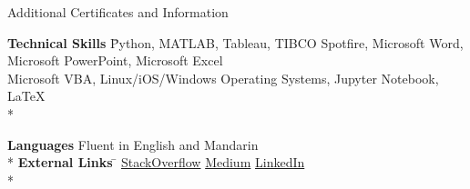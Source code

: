 \documentclass{article}
\newlength{\tabin}
\newlength{\secsep}
\newcommand{\lineunder}{\vspace*{-8pt} \\ \hspace*{-6pt} \hrulefill \\ \vspace*{-15pt}}
\newenvironment{tabbedsection}[1]{
  \begin{list}{}{
      \setlength{\itemsep}{0pt}
      \setlength{\labelsep}{0pt}
      \setlength{\labelwidth}{0pt}
      \setlength{\leftmargin}{\tabin}
      \setlength{\rightmargin}{\tabin}
      \setlength{\listparindent}{0pt}
      \setlength{\parsep}{0pt}
      \setlength{\parskip}{0pt}
      \setlength{\partopsep}{0pt}
      \setlength{\topsep}{#1}
    }
  \item[]
}{\end{list}}
\newenvironment{nospacetabbing}{
    \begin{tabbing}
}{\end{tabbing}\vspace{-1.2em}}
\newenvironment{resume_section}[1]{
  \filbreak
  \vspace{2\secsep}
  \textsc{\large#1}
  \lineunder
  \begin{tabbedsection}{\secsep}
}{\end{tabbedsection}}
\begin{document}
\begin{resume_section}{Additional Certificates and Information}
\vspace{5mm} 
 
\begin{nospacetabbing}
  \textbf{Technical Skills}  \= Python, MATLAB, Tableau, TIBCO Spotfire, Microsoft Word, Microsoft PowerPoint, Microsoft Excel \\
  
  \hspace*{2.7cm} Microsoft VBA, Linux/iOS/Windows Operating Systems, Jupyter Notebook, \LaTeX\\*
  
  \textbf{Languages} \> Fluent in English and Mandarin\\*
  \textbf{External Links} \=  \hspace*{0.0mm} \href{https://stackoverflow.com/users/9191460/rui-nian?tab=profile}{StackOverflow} \href{https://medium.com/@ruinian}{Medium} \href{https://www.linkedin.com/in/rui-nian-a1892a93/}{LinkedIn} \\*
  
  \end{nospacetabbing}

\end{resume_section}
\end{document}
